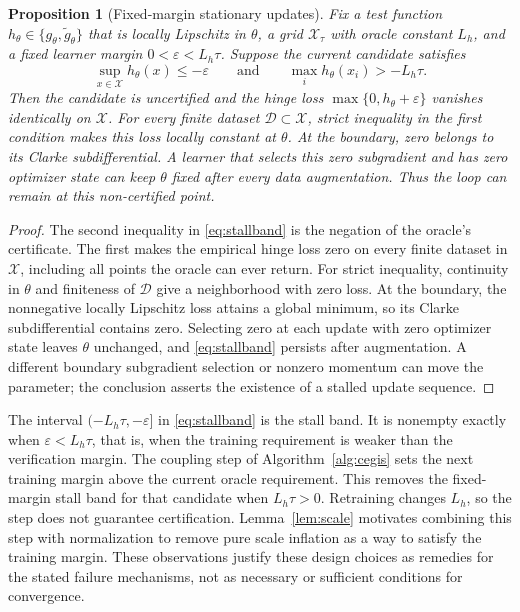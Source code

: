 \documentclass[12pt,onecolumn,journal]{IEEEtran}
\newtheorem{proposition}{Proposition}
\newcommand{\X}{\mathcal{X}}
\newcommand{\D}{\mathcal{D}}
\begin{document}
\begin{proposition}[Fixed-margin stationary updates]
\label{lem:stall}
Fix a test function $h_\theta \in \{g_\theta, \tilde g_\theta\}$ that is locally Lipschitz in $\theta$, a grid $\X_\tau$ with oracle constant $L_h$, and a fixed learner margin $0<\varepsilon < L_h \tau$. Suppose the current candidate satisfies
\begin{equation}
\sup_{x \in \X} h_\theta(x) \le -\varepsilon
\qquad \text{and} \qquad
\max_i h_\theta(x_i) > -L_h \tau .
\label{eq:stallband}
\end{equation}
Then the candidate is uncertified and the hinge loss $\max\{0,h_\theta+\varepsilon\}$ vanishes identically on $\X$. For every finite dataset $\D\subset\X$, strict inequality in the first condition makes this loss locally constant at $\theta$. At the boundary, zero belongs to its Clarke subdifferential. A learner that selects this zero subgradient and has zero optimizer state can keep $\theta$ fixed after every data augmentation. Thus the loop can remain at this non-certified point.
\end{proposition}

\begin{proof}
The second inequality in \eqref{eq:stallband} is the negation of the oracle's certificate. The first makes the empirical hinge loss zero on every finite dataset in $\X$, including all points the oracle can ever return. For strict inequality, continuity in $\theta$ and finiteness of $\D$ give a neighborhood with zero loss. At the boundary, the nonnegative locally Lipschitz loss attains a global minimum, so its Clarke subdifferential contains zero. Selecting zero at each update with zero optimizer state leaves $\theta$ unchanged, and \eqref{eq:stallband} persists after augmentation. A different boundary subgradient selection or nonzero momentum can move the parameter; the conclusion asserts the existence of a stalled update sequence.
\end{proof}

The interval $(-L_h\tau, -\varepsilon]$ in \eqref{eq:stallband} is the stall band. It is nonempty exactly when $\varepsilon < L_h\tau$, that is, when the training requirement is weaker than the verification margin. The coupling step of Algorithm~\ref{alg:cegis} sets the next training margin above the current oracle requirement. This removes the fixed-margin stall band for that candidate when $L_h\tau > 0$. Retraining changes $L_h$, so the step does not guarantee certification. Lemma~\ref{lem:scale} motivates combining this step with normalization to remove pure scale inflation as a way to satisfy the training margin. These observations justify these design choices as remedies for the stated failure mechanisms, not as necessary or sufficient conditions for convergence.
\end{document}
